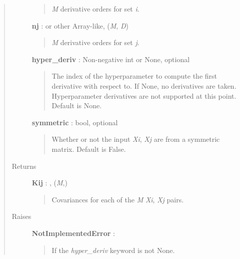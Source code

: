 \documentclass[letterpaper,10pt,english]{sphinxmanual}
\begin{document}
\begin{fulllineitems}
\begin{fulllineitems}
\begin{quote}
\begin{description}
\begin{quote}
\emph{M} derivative orders for set \emph{i}.
\end{quote}

\textbf{nj} :  or other Array-like, (\emph{M}, \emph{D})
\begin{quote}

\emph{M} derivative orders for set \emph{j}.
\end{quote}

\textbf{hyper\_deriv} : Non-negative int or None, optional
\begin{quote}

The index of the hyperparameter to compute the first derivative
with respect to. If None, no derivatives are taken. Hyperparameter
derivatives are not supported at this point. Default is None.
\end{quote}

\textbf{symmetric} : bool, optional
\begin{quote}

Whether or not the input \emph{Xi}, \emph{Xj} are from a symmetric matrix.
Default is False.
\end{quote}

\item[{Returns}] \leavevmode
\textbf{Kij} : , (\emph{M},)
\begin{quote}

Covariances for each of the \emph{M} \emph{Xi}, \emph{Xj} pairs.
\end{quote}

\item[{Raises}] \leavevmode
\textbf{NotImplementedError} :
\begin{quote}

If the \emph{hyper\_deriv} keyword is not None.
\end{quote}

\end{description}\end{quote}

\end{fulllineitems}


\end{fulllineitems}

\end{document}
